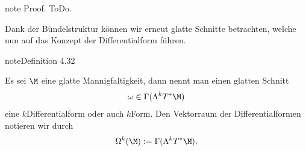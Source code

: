 \documentclass[letterpaper,10pt,german]{jupyterBook}
\begin{document}
\begin{sphinxadmonition}{note}
\sphinxAtStartPar
Proof. ToDo.
\end{sphinxadmonition}

\sphinxAtStartPar
Dank der Bündelstruktur können wir erneut glatte Schnitte betrachten, welche nun auf das Konzept der Differentialform führen.
\label{manifolds/diffformen:definition-2}
\begin{sphinxadmonition}{note}{Definition 4.32}



\sphinxAtStartPar
Es sei \(\M\) eine glatte Mannigfaltigkeit, dann nennt man einen glatten Schnitt
\begin{equation*}
\begin{split}\omega\in \Gamma(\Lambda^k T^\ast\M)\end{split}
\end{equation*}
\sphinxAtStartPar
eine \(k\)\sphinxhyphen{}Differentialform oder auch \(k\)\sphinxhyphen{}Form. Den Vektorraum der Differentialformen notieren wir durch
\begin{equation*}
\begin{split}\Omega^k(\M) := \Gamma(\Lambda^k T^\ast\M).\end{split}
\end{equation*}\end{sphinxadmonition}
\end{document}
